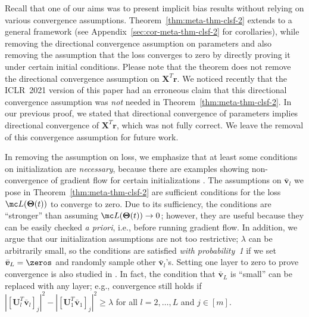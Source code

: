 \documentclass{article} %
\def\vr{{\bm{r}}}
\def\vv{{\bm{v}}}
\def\mU{{\bm{U}}}
\def\mX{{\bm{X}}}
\newcommand{\bTheta}{\bm{\Theta}}
\begin{document}
\begin{remark}
Recall that one of our aims was to present implicit bias results without relying on various convergence assumptions. Theorem~\ref{thm:meta-thm-clsf-2} extends \citet{gunasekar2018implicit} to a general framework (see Appendix~\ref{sec:cor-meta-thm-clsf-2} for corollaries), while removing the directional convergence assumption on parameters and also removing the assumption that the loss converges to zero by directly proving it under certain initial conditions.
Please note that the theorem does not remove the directional convergence assumption on $\mX^T\vr$. We noticed recently that the ICLR~2021 version of this paper had an erroneous claim that this directional convergence assumption was \emph{not} needed in Theorem~\ref{thm:meta-thm-clsf-2}. In our previous proof, we stated that directional convergence of parameters implies directional convergence of $\mX^T \vr$, which was not fully correct. We leave the removal of this convergence assumption for future work.
\end{remark}

\begin{remark}
In removing the assumption on loss, we emphasize that at least some conditions on initialization are \emph{necessary}, because there are examples showing non-convergence of gradient flow for certain initializations \citep{bartlett2018gradient,arora2019convergence}.
The assumptions on $\bar \vv_l$ we pose in Theorem~\ref{thm:meta-thm-clsf-2} are sufficient conditions for the loss $\mc L(\bTheta(t))$ to converge to zero. Due to its sufficiency, the conditions are ``stronger'' than assuming $\mc L(\bTheta(t)) \to 0$; however, they are useful because they can be easily checked \emph{a priori}, i.e., before running gradient flow.
In addition, we argue that our initialization assumptions are not too restrictive; $\lambda$ can be arbitrarily small, so the conditions are satisfied \emph{with probability~1} if we set $\bar \vv_L = \zeros$ and randomly sample other $\bar \vv_l$'s. Setting one layer to zero to prove convergence is also studied in \citet{wu2019global}. In fact, the condition that $\bar \vv_L$ is ``small'' can be replaced with any layer; e.g., convergence still holds if $|[\mU_l^T \bar \vv_l]_j|^2 - |[\mU_1^T \bar \vv_1]_j|^2 \geq \lambda$ for all $l = 2, \dots, L$ and $j \in [m]$.
\end{remark}
\end{document}
